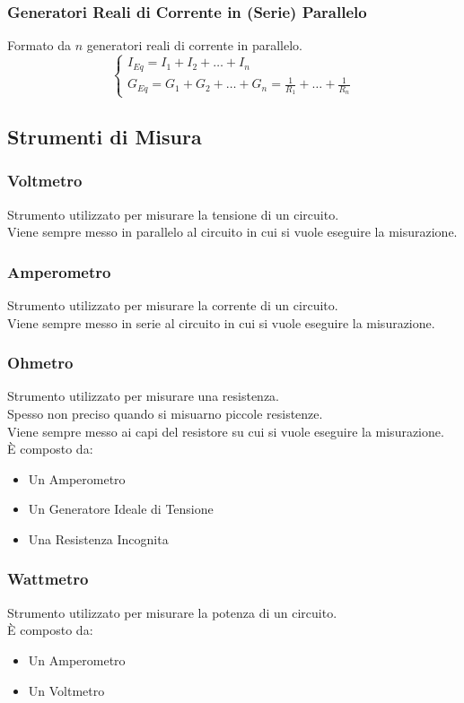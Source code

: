 \documentclass[../main.tex]{subfiles}
\begin{document}
	\subsubsection{Generatori Reali di Corrente in (Serie) Parallelo}
	Formato da $n$ generatori reali di corrente in parallelo.
	\[
		\begin{cases}
			I_{Eq} = I_1 + I_2 + \dots + I_n \\
			G_{Eq} = G_1 + G_2 + \dots + G_n = \frac{1}{R_1} + \dots + \frac{1}{R_n}
		\end{cases}
	\]
	\subsection{Strumenti di Misura}
	\subsubsection{Voltmetro}
	Strumento utilizzato per misurare la tensione di un circuito.\\
	Viene sempre messo in parallelo al circuito in cui si vuole eseguire la misurazione.
	\subsubsection{Amperometro}
	Strumento utilizzato per misurare la corrente di un circuito.\\
	Viene sempre messo in serie al circuito in cui si vuole eseguire la misurazione.
	\subsubsection{Ohmetro}
	Strumento utilizzato per misurare una resistenza.\\
	Spesso non preciso quando si misuarno piccole resistenze.\\
	Viene sempre messo ai capi del resistore su cui si vuole eseguire la misurazione.\\
	È composto da:
	\begin{itemize}
		\item Un Amperometro
		\item Un Generatore Ideale di Tensione
		\item Una Resistenza Incognita
	\end{itemize}
	\subsubsection{Wattmetro}
	Strumento utilizzato per misurare la potenza di un circuito.\\
	È composto da:
	\begin{itemize}
		\item Un Amperometro
		\item Un Voltmetro
	\end{itemize}
\end{document}
